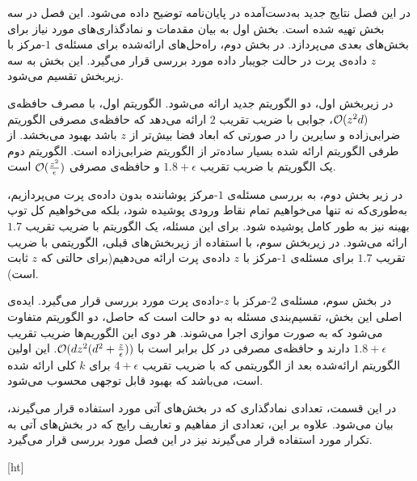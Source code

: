 

در این فصل نتایج جدید به‌دست‌آمده در پایان‌نامه توضیح داده می‌شود. این فصل در سه بخش تهیه شده است. بخش اول به بیان مقدمات و نمادگذاری‌های مورد نیاز برای بخش‌های بعدی می‌پردازد. در بخش دوم، راه‌حل‌های ارائه‌شده برای مسئله‌ی $1$-مرکز با $z$ داده‌ی پرت در حالت جویبار داده مورد بررسی قرار می‌گیرد. این بخش به سه زیربخش تقسیم می‌شود. 

در زیربخش اول، دو الگوریتم جدید ارائه می‌شود. الگوریتم اول، با مصرف حافظه‌ی $\mathcal{O}(z^2d)$، جوابی با ضریب تقریب $2$ ارائه می‌دهد که حافظه‌ی مصرفی الگوریتم ضرابی‌زاده و سایرین  را در صورتی که ابعاد فضا بیش‌تر از $z$ باشد بهبود می‌بخشد. از طرفی الگوریتم ارائه شده بسیار ساده‌تر از الگوریتم ضرابی‌زاده است. الگوریتم دوم یک الگوریتم با ضریب تقریب $1.8 + \epsilon$ و حافظه‌ی مصرفی $\mathcal{O}(\frac{z^2}{\epsilon})$ است.

در زیر بخش دوم، به بررسی مسئله‌ی $1$-مرکز پوشاننده بدون داده‌ی پرت می‌پردازیم، به‌طوری‌که نه تنها می‌خواهیم تمام نقاط ورودی پوشیده شود، بلکه می‌خواهیم کل توپ بهینه نیز به طور کامل پوشیده شود. برای این مسئله، یک الگوریتم با ضریب تقریب $1.7$ ارائه می‌شود. در زیربخش سوم، با استفاده از زیربخش‌های قبلی، الگوریتمی با ضریب تقریب $1.7$ برای مسئله‌ی $1$-مرکز با $z$ داده‌ی پرت ارائه می‌دهیم(برای حالتی که $z$ ثابت است). 

در بخش سوم، مسئله‌ی $2$-مرکز با $z$-داده‌ی پرت مورد بررسی قرار می‌گیرد. ایده‌ی اصلی این بخش، تقسیم‌بندی مسئله به دو حالت است که حاصل، دو الگوریتم متفاوت می‌شود که به صورت موازی اجرا می‌شوند. هر دوی این الگوریم‌ها ضریب تقریب $1.8 + \epsilon$ دارند و حافظه‌ی مصرفی در کل برابر است با 
$\mathcal{O}(dz^2 (d^2 + \frac{z}{\epsilon}))$.
این اولین الگوریتم ارائه‌شده‌ بعد از الگوریتمی که با ضریب تقریب $4+\epsilon$ برای $k$ کلی ارائه شده است، می‌باشد که بهبود قابل توجهی محسوب می‌شود.


در این قسمت، تعدادی نمادگذاری که در بخش‌های آتی مورد استفاده قرار می‌گیرند، بیان می‌شود. علاوه بر این، تعدادی از مفاهیم و تعاریف رایج که در بخش‌های آتی به تکرار مورد استفاده قرار می‌گیرند نیز در این فصل مورد بررسی قرار می‌گیرد.


[ht]



 
